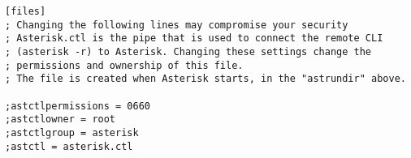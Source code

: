 \begin{astlisting}
\begin{verbatim}
[files]
; Changing the following lines may compromise your security
; Asterisk.ctl is the pipe that is used to connect the remote CLI
; (asterisk -r) to Asterisk. Changing these settings change the
; permissions and ownership of this file. 
; The file is created when Asterisk starts, in the "astrundir" above.

;astctlpermissions = 0660
;astctlowner = root
;astctlgroup = asterisk
;astctl = asterisk.ctl

\end{verbatim}
\end{astlisting}
